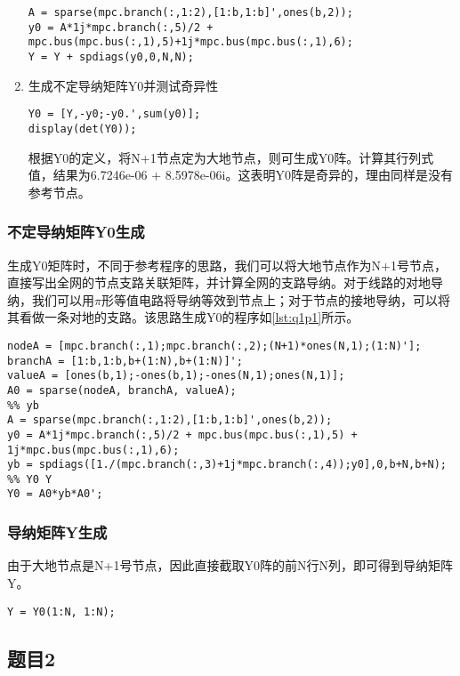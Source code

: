\documentclass[a4paper,12pt]{article}
\begin{document}
\begin{enumerate}
      \begin{lstlisting}[style=Matlab-editor,basicstyle=\mlttfamily]
A = sparse(mpc.branch(:,1:2),[1:b,1:b]',ones(b,2));
y0 = A*1j*mpc.branch(:,5)/2 + mpc.bus(mpc.bus(:,1),5)+1j*mpc.bus(mpc.bus(:,1),6);
Y = Y + spdiags(y0,0,N,N);
      \end{lstlisting}
      \item 生成不定导纳矩阵Y0并测试奇异性
      \begin{lstlisting}[style=Matlab-editor,basicstyle=\mlttfamily]
Y0 = [Y,-y0;-y0.',sum(y0)];
display(det(Y0));
      \end{lstlisting}
      根据Y0的定义，将N+1节点定为大地节点，则可生成Y0阵。计算其行列式值，结果为6.7246e-06 + 8.5978e-06i。这表明Y0阵是奇异的，理由同样是没有参考节点。
    \end{enumerate}
    \subsubsection{不定导纳矩阵Y0生成}
    生成Y0矩阵时，不同于参考程序的思路，我们可以将大地节点作为N+1号节点，直接写出全网的节点支路关联矩阵，并计算全网的支路导纳。对于线路的对地导纳，我们可以用$\pi$形等值电路将导纳等效到节点上；对于节点的接地导纳，可以将其看做一条对地的支路。该思路生成Y0的程序如\cref{lst:q1p1}所示。
    \begin{lstlisting}[style=Matlab-editor,basicstyle=\mlttfamily,label=lst:q1p1,caption={不定节点导纳矩阵Y0生成程序}]
%% A0
nodeA = [mpc.branch(:,1);mpc.branch(:,2);(N+1)*ones(N,1);(1:N)'];
branchA = [1:b,1:b,b+(1:N),b+(1:N)]';
valueA = [ones(b,1);-ones(b,1);-ones(N,1);ones(N,1)];
A0 = sparse(nodeA, branchA, valueA);
%% yb
A = sparse(mpc.branch(:,1:2),[1:b,1:b]',ones(b,2));
y0 = A*1j*mpc.branch(:,5)/2 + mpc.bus(mpc.bus(:,1),5) + 1j*mpc.bus(mpc.bus(:,1),6);
yb = spdiags([1./(mpc.branch(:,3)+1j*mpc.branch(:,4));y0],0,b+N,b+N);
%% Y0 Y
Y0 = A0*yb*A0';
    \end{lstlisting}
    \subsubsection{导纳矩阵Y生成}
    由于大地节点是N+1号节点，因此直接截取Y0阵的前N行N列，即可得到导纳矩阵Y。
    \begin{lstlisting}[style=Matlab-editor,basicstyle=\mlttfamily]
Y = Y0(1:N, 1:N);
    \end{lstlisting}
    \subsection{题目2}
\end{document}
